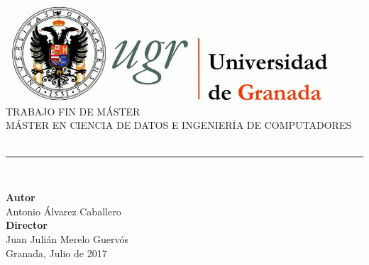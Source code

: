\begin{titlepage}


\newlength{\centeroffset}
\setlength{\centeroffset}{-0.5\oddsidemargin}
\addtolength{\centeroffset}{0.5\evensidemargin}
\thispagestyle{empty}

\noindent\hspace*{\centeroffset}\begin{minipage}{\textwidth}

\centering
\includegraphics[width=0.9\textwidth]{imagenes/logo_ugr.jpg}\\[1.4cm]

\textsc{ \Large TRABAJO FIN DE MÁSTER\\[0.2cm]}
\textsc{ MÁSTER EN CIENCIA DE DATOS E INGENIERÍA DE COMPUTADORES}\\[1cm]
%
{\Huge\bfseries \myTitle\\
}
\noindent\rule[-1ex]{\textwidth}{3pt}\\[3.5ex]
\end{minipage}

\vspace{2.0cm}
\noindent\hspace*{\centeroffset}\begin{minipage}{\textwidth}
\centering

\textbf{Autor}\\ {Antonio Álvarez Caballero}\\[2.5ex]
\textbf{Director}\\
{Juan Julián Merelo Guervós}\\[2cm]

Granada, Julio de 2017
\end{minipage}
\end{titlepage}
